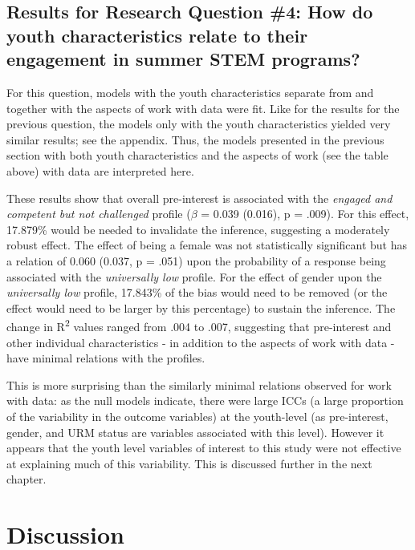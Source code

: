 \documentclass[]{book}
\theoremstyle{definition}
\theoremstyle{definition}
\theoremstyle{definition}
\theoremstyle{remark}
\begin{document}
\section{Results for Research Question \#4: How do youth characteristics
relate to their engagement in summer STEM
programs?}\label{results-for-research-question-4-how-do-youth-characteristics-relate-to-their-engagement-in-summer-stem-programs}

For this question, models with the youth characteristics separate from
and together with the aspects of work with data were fit. Like for the
results for the previous question, the models only with the youth
characteristics yielded very similar results; see the appendix. Thus,
the models presented in the previous section with both youth
characteristics and the aspects of work (see the table above) with data
are interpreted here.

These results show that overall pre-interest is associated with the
\emph{engaged and competent but not challenged} profile (\(\beta\) =
0.039 (0.016), p = .009). For this effect, 17.879\% would be needed to
invalidate the inference, suggesting a moderately robust effect. The
effect of being a female was not statistically significant but has a
relation of 0.060 (0.037, p = .051) upon the probability of a response
being associated with the \emph{universally low} profile. For the effect
of gender upon the \emph{universally low} profile, 17.843\% of the bias
would need to be removed (or the effect would need to be larger by this
percentage) to sustain the inference. The change in R\textsuperscript{2}
values ranged from .004 to .007, suggesting that pre-interest and other
individual characteristics - in addition to the aspects of work with
data - have minimal relations with the profiles.

This is more surprising than the similarly minimal relations observed
for work with data: as the null models indicate, there were large ICCs
(a large proportion of the variability in the outcome variables) at the
youth-level (as pre-interest, gender, and URM status are variables
associated with this level). However it appears that the youth level
variables of interest to this study were not effective at explaining
much of this variability. This is discussed further in the next chapter.

\chapter{Discussion}\label{discussion}
\end{document}
